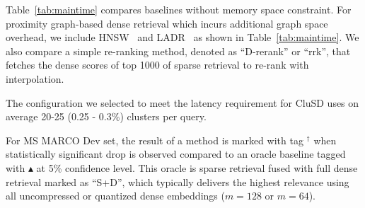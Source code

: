 Table~\ref{tab:maintime} compares  baselines  without  memory space constraint. 
For proximity graph-based dense retrieval which incurs additional graph space overhead,
we include  HNSW~\cite{2020TPAMI-HNSW} and  LADR~\cite{2023SIGIR-LADR} as shown in Table~\ref{tab:maintime}. 
We also compare  a simple re-ranking method,  denoted as ``D-rerank'' or ``rrk'', 
that fetches the dense scores of top 1000 of sparse retrieval to re-rank with interpolation. 

The configuration we selected to meet the latency requirement for CluSD uses on average 20-25 (0.25 - 0.3\%) clusters per query. 

For MS MARCO Dev set, the result of a method is marked with  tag $^\dag$ when 
statistically significant drop is observed compared to  an oracle baseline
tagged with $\blacktriangle$ at 5\% confidence level.  This oracle
is sparse retrieval fused with full dense retrieval marked as ``S+D'', which typically delivers the highest relevance  
using all uncompressed or quantized dense embeddings ($m=128$ or $m=64$).
